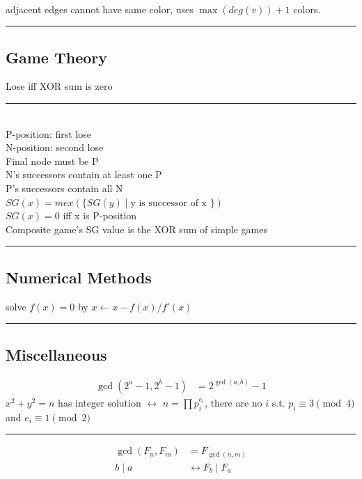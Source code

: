 \documentclass[10pt,letterpaper,landscape]{article}
\begin{document}
\begin{multicols}{2}
 \\ adjacent edges cannot have same color, uses $\max{(deg(v))} + 1$ colors. 

\noindent\rule{\linewidth}{1pt}

\subsection{Game Theory}

 Lose iff XOR sum is zero

\noindent\rule{\linewidth}{1pt}

 \\
P-position: first lose \\
N-position: second lose \\
Final node must be P \\
N's successors contain at least one P \\
P's successors contain all N \\
$SG(x) = mex(\{SG(y) \mid \text{y is successor of x }\})$ \\
$SG(x) = 0$ iff x is P-position \\
Composite game's SG value is the XOR sum of simple games

\noindent\rule{\linewidth}{1pt}

\subsection{Numerical Methods}

 solve $f(x) = 0$ by $x \leftarrow x - f(x) / f'(x)$

\noindent\rule{\linewidth}{1pt}

\subsection{Miscellaneous}

\begin{align*}
	\gcd(2^a-1, 2^b-1) &= 2^{\gcd(a,b)}-1
\end{align*}
$x^2 + y^2 = n$ has integer solution $\leftrightarrow$ $n = \prod{p_i^{e_i}}$, there are no $i$ s.t. $p_i \equiv 3 \pmod{4}$ and $e_i \equiv 1 \pmod{2}$

\noindent\rule{\linewidth}{1pt}

\begin{align*}
	\gcd(F_n, F_m) &= F_{\gcd(n, m)} \\
	b \mid a &\leftrightarrow F_b \mid F_a
\end{align*}


\end{multicols}
\end{document}
